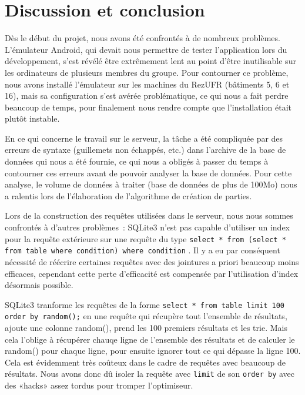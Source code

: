 \documentclass[a4paper,11pt,french]{article}
\def\android{Android\texttrademark{}}
\begin{document}
\pagebreak

\section{Discussion et conclusion}

Dès le début du projet, nous avons été confrontés à de nombreux problèmes. L'émulateur \android{}, qui devait nous permettre de tester
l'application lors du développement, s'est révélé être extrêmement lent au point d'être inutilisable sur les ordinateurs de plusieurs membres
du groupe. Pour contourner ce problème, nous avons installé l'émulateur sur les machines du RezUFR (bâtiments 5, 6 et 16), mais sa
configuration s'est avérée problématique, ce qui nous a fait perdre beaucoup de temps, pour finalement nous rendre compte que l'installation était plutôt instable.

En ce qui concerne le travail sur le serveur, la tâche a été compliquée par des erreurs de syntaxe (guillemets non échappés, etc.) dans
l'archive de la base de données qui nous a été fournie, ce qui nous a obligés à passer du temps à contourner ces erreurs avant de pouvoir
analyser la base de données. Pour cette analyse, le volume de données à traiter (base de données de plus de 100Mo) nous a ralentis lors de
l'élaboration de l'algorithme de création de parties.

Lors de la construction des requêtes utilisées dans le serveur, nous nous sommes confrontés à d'autres problèmes~: SQLite3 n'est pas capable d'utiliser un index pour la requête extérieure sur une requête du type
\texttt{select * from (select * from table where condition) where condition} .
Il y a eu par conséquent nécessité de réécrire certaines requêtes avec des jointures a priori beaucoup moins efficaces, cependant cette perte d'efficacité est compensée par l'utilisation d'index désormais possible.

SQLite3 tranforme les requêtes de la forme \texttt{select * from table limit 100 order by random();} en une requête qui récupère tout l'ensemble
de résultats, ajoute une colonne random(), prend les 100 premiers résultats et les trie. Mais cela l'oblige à récupérer chauqe ligne de l'ensemble des
résultats et de calculer le random() pour chaque ligne, pour ensuite ignorer tout ce qui dépasse la ligne 100. Cela est évidemment très coûteux
dans le cadre de requêtes avec beaucoup de résultats. Nous avons donc dû isoler la requête avec \verb!limit! de son \verb!order by! avec
des «hacks» assez tordus pour tromper l'optimiseur.
\end{document}
